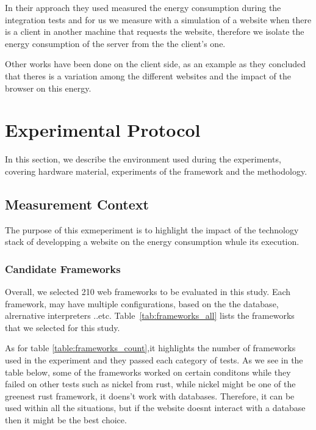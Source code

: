In their approach they used measured the energy consumption during the integration tests and for us we measure with a simulation of a website when there is a client in another machine that requests the website, therefore we isolate the energy consumption of the server from the the client's one.


Other works have been done on the client side, as an example \cite{philippot_characterization_2014} as they concluded that theres is a variation among the different websites and the impact of the browser on this energy.


\newcommand\duration{20}
\newcommand\parallelclient{512}
\section{Experimental Protocol}

In this section, we describe the environment used during the experiments, covering hardware material, experiments of the framework and the methodology.


\subsection{Measurement Context}
The purpose of this exmeperiment is to highlight the impact of the technology stack of developping a website on the energy consumption whule its execution.
\subsubsection{Candidate Frameworks}
Overall, we selected 210 web frameworks to be evaluated in this study.
Each framework, may have multiple configurations, based on the the database, alrernative interpreters  ..etc.
Table~\ref{tab:frameworks_all} lists the frameworks that we selected for this study.

% 
As for table \ref{table:frameworks_count},it  highlights the number of frameworks used in the experiment and they passed each category of tests.
As we see in the table below, some of the frameworks worked on certain conditons while they failed on other tests such as nickel from rust, while nickel might be one of the greenest rust framework, it doens't work with databases. Therefore, it can be used within all the situations, but if the website doesnt interact with a database then it might be the best choice.

